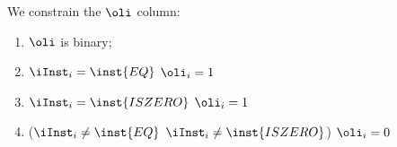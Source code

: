 We constrain the $\oli$ column:
\begin{enumerate}
	\item $\oli$ is binary;
	\item \If $\iInst_{i} = \inst{EQ}$ \Then $\oli_{i} = 1$
	\item \If $\iInst_{i} = \inst{ISZERO}$ \Then $\oli_{i} = 1$
	\item \If \big($\iInst_{i} \neq \inst{EQ}$ \et $\iInst_{i} \neq \inst{ISZERO}$\big) \Then $\oli_{i} = 0$
\end{enumerate}